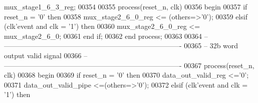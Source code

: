 \begin{DoxyCode}
{      mux_stage1_6_3_reg};
00354 
00355 \textcolor{keywordflow}{process}(reset_n, clk)
00356 \textcolor{vhdlkeyword}{begin}
00357    \textcolor{keywordflow}{if} \textcolor{vhdlchar}{reset_n} \textcolor{vhdlchar}{=} \textcolor{vhdlchar}{'}\textcolor{vhdllogic}{}\textcolor{vhdllogic}{0}\textcolor{vhdlchar}{'} \textcolor{keywordflow}{then}
00358       \textcolor{vhdlchar}{mux_stage2_6_0_reg} \textcolor{vhdlchar}{<=} \textcolor{vhdlchar}{(}\textcolor{keywordflow}{others}\textcolor{vhdlchar}{=}\textcolor{vhdlchar}{>}\textcolor{vhdlchar}{'}\textcolor{vhdllogic}{}\textcolor{vhdllogic}{0}\textcolor{vhdlchar}{'}\textcolor{vhdlchar}{)};
00359    \textcolor{keywordflow}{elsif} \textcolor{vhdlchar}{(}\textcolor{vhdlchar}{clk}\textcolor{vhdlchar}{'}\textcolor{vhdlkeyword}{event} \textcolor{keywordflow}{and} \textcolor{vhdlchar}{clk} \textcolor{vhdlchar}{=} \textcolor{vhdlchar}{'}\textcolor{vhdllogic}{}\textcolor{vhdllogic}{1}\textcolor{vhdlchar}{'}\textcolor{vhdlchar}{)} \textcolor{keywordflow}{then}
00360       \textcolor{vhdlchar}{mux_stage2_6_0_reg} \textcolor{vhdlchar}{<=} \textcolor{vhdlchar}{mux_stage2_6_0};
00361    \textcolor{keywordflow}{end} \textcolor{keywordflow}{if};
00362 \textcolor{keywordflow}{end} \textcolor{keywordflow}{process};
00363 
00364 \textcolor{keyword}{-- ----------------------------------------------------------------------------}
00365 \textcolor{keyword}{-- 32b word output valid signal}
00366 \textcolor{keyword}{-- ----------------------------------------------------------------------------}
00367 \textcolor{keywordflow}{process}(reset_n, clk)
00368 \textcolor{vhdlkeyword}{begin}
00369    \textcolor{keywordflow}{if} \textcolor{vhdlchar}{reset_n} \textcolor{vhdlchar}{=} \textcolor{vhdlchar}{'}\textcolor{vhdllogic}{}\textcolor{vhdllogic}{0}\textcolor{vhdlchar}{'} \textcolor{keywordflow}{then}
00370       \textcolor{vhdlchar}{data_out_valid_reg}   \textcolor{vhdlchar}{<=}\textcolor{vhdlchar}{'}\textcolor{vhdllogic}{}\textcolor{vhdllogic}{0}\textcolor{vhdlchar}{'};
00371       \textcolor{vhdlchar}{data_out_valid_pipe}  \textcolor{vhdlchar}{<=}\textcolor{vhdlchar}{(}\textcolor{keywordflow}{others}\textcolor{vhdlchar}{=}\textcolor{vhdlchar}{>}\textcolor{vhdlchar}{'}\textcolor{vhdllogic}{}\textcolor{vhdllogic}{0}\textcolor{vhdlchar}{'}\textcolor{vhdlchar}{)};
00372    \textcolor{keywordflow}{elsif} \textcolor{vhdlchar}{(}\textcolor{vhdlchar}{clk}\textcolor{vhdlchar}{'}\textcolor{vhdlkeyword}{event} \textcolor{keywordflow}{and} \textcolor{vhdlchar}{clk} \textcolor{vhdlchar}{=} \textcolor{vhdlchar}{'}\textcolor{vhdllogic}{}\textcolor{vhdllogic}{1}\textcolor{vhdlchar}{'}\textcolor{vhdlchar}{)} \textcolor{keywordflow}{then}

\end{DoxyCode}
